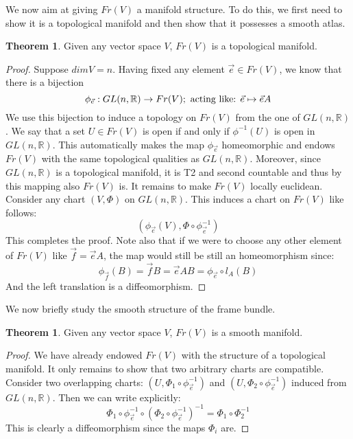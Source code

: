 \documentclass[12pt,a4paper]{report}
\theoremstyle{definition}
\theoremstyle{Theorem}
\newtheorem{Theo}[Def]{Theorem}
\theoremstyle{definition}
\theoremstyle{definition}
\begin{document}
		We now aim at giving $Fr(V)$ a manifold structure. To do this, we first need to show it is a topological manifold and then show that it possesses a smooth atlas.
		\begin{Theo}
			Given any vector space $V$, $Fr(V)$ is a topological manifold.
		\end{Theo}
		\begin{proof}
			Suppose $dim V=n$. Having fixed any element $\vec{e}\in Fr(V)$, we know that there is a bijection 
			$$\phi_{\vec{e}}:GL(n,\mathbb{R})\rightarrow Fr(V); \hbox{ acting like: }\vec{e}\mapsto\vec{e}A$$
			We use this bijection to induce a topology on $Fr(V)$ from the one of $GL(n,\mathbb{R})$. We say that a set $U\in Fr(V)$ is open if and only if $\phi^{-1}(U)$ is open in $GL(n,\mathbb{R})$. This automatically makes the map $\phi_{\vec{e}}$ homeomorphic and endows $Fr(V)$ with the same topological qualities as $GL(n,\mathbb{R})$. Moreover, since $GL(n,\mathbb{R})$ is a topological manifold, it is T2 and second countable and thus by this mapping also $Fr(V)$ is.
			It remains to make $Fr(V)$ locally euclidean. Consider any chart $(V,\Phi)$ on $GL(n,\mathbb{R})$. This induces a chart on $Fr(V)$ like follows:
			$$(\phi_{\vec{e}}(V),\Phi\circ\phi^{-1}_{\vec{e}})$$
			This completes the proof.
			Note also that if we were to choose any other element of $Fr(V)$ like $\vec{f}=\vec{e}A$, the map would still be still an homeomorphism since:
			$$\phi_{\vec{f}}(B)=\vec{f}B=\vec{e}AB=\phi_{\vec{e}}\circ l_A(B)$$
			And the left translation is a diffeomorphism.
		\end{proof}
		We now briefly study the smooth structure of the frame bundle. 
		\begin{Theo}
			Given any vector space $V$, $Fr(V)$ is a smooth manifold.
		\end{Theo}
		\begin{proof}
			We have already endowed $Fr(V)$ with the structure of a topological manifold. It only remains to show that two arbitrary charts are compatible. Consider two overlapping charts: $(U,\Phi_1\circ\phi^{-1}_{\vec{e}})$ and $(U,\Phi_2\circ\phi^{-1}_{\vec{e}})$ induced from $GL(n,\mathbb{R})$. Then we can write explicitly:
			$$\Phi_1\circ\phi^{-1}_{\vec{e}}\circ (\Phi_2\circ\phi^{-1}_{\vec{e}})^{-1}=
			\Phi_1\circ \Phi_2^{-1}$$ 
			This is clearly a diffeomorphism since the maps $\Phi_i$ are.
		\end{proof}
\end{document}
